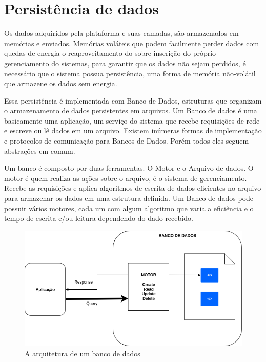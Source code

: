 \section{Persistência de dados}
\label{section:persistencia}

Os dados adquiridos pela plataforma e suas camadas, são armazenados em memórias e enviados. Memórias voláteis que podem facilmente perder dados com quedas de energia o reaproveitamento do sobre-inscrição do próprio gerenciamento do sistemas, para garantir que os dados não sejam perdidos, é necessário que o sistema possua persistência, uma forma de memória não-volátil que armazene os dados sem energia.

Essa persistência é implementada com Banco de Dados, estruturas que organizam o armazenamento de dados persistentes em arquivos. Um Banco de dados é uma basicamente uma aplicação, um serviço do sistema que recebe requisições de rede e escreve ou lê dados em um arquivo. Existem inúmeras formas de implementação e protocolos de comunicação para Bancos de Dados. Porém todos eles seguem abstrações em comum.

Um banco é composto por duas ferramentas. O Motor e o Arquivo de dados. O motor é quem realiza as ações sobre o arquivo, é o sistema de gerenciamento. Recebe as requisições e aplica algoritmos de escrita de dados eficientes no arquivo para armazenar os dados em uma estrutura definida. Um Banco de dados pode possuir vários motores, cada um com algum algoritmo que varia a eficiência e o tempo de escrita e/ou leitura dependendo do dado recebido.

\begin{figure}[h!]
\centering
\includegraphics[width=12cm]{./02_Capitulos/02_Cap3/figures/Database_Arch}
\caption{A arquitetura de um banco de dados}
\label{fig:3.3.5/database_arch}
\end{figure}

